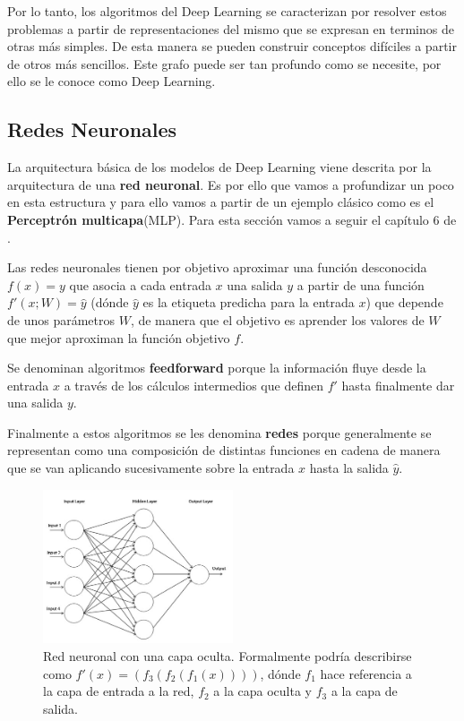     Por lo tanto, los algoritmos del Deep Learning se caracterizan por resolver estos problemas a partir de representaciones del mismo que se expresan en terminos de otras más simples. De esta manera se pueden construir conceptos difíciles a partir de otros más sencillos. Este grafo puede ser tan profundo como se necesite, por ello se le conoce como Deep Learning.

    \subsection{Redes Neuronales} \label{sub:redes_neuronales}
        La arquitectura básica de los modelos de Deep Learning viene descrita por la arquitectura de una \textbf{red neuronal}. Es por ello que vamos a profundizar un poco en esta estructura y para ello vamos a partir de un ejemplo clásico como es el \textbf{Perceptrón multicapa}(MLP). Para esta sección vamos a seguir el capítulo 6 de \cite{Goodfellow-et-al-2016}.

        \medskip

        \noindent Las redes neuronales tienen por objetivo aproximar una función desconocida $f(x)=y$ que asocia a cada entrada $x$ una salida $y$ a partir de una función $f'(x;W)= \widehat{y}$ (dónde $\widehat{y}$ es la etiqueta predicha para la entrada $x$) que depende de unos parámetros $W$, de manera que el objetivo es aprender los valores de $W$ que mejor aproximan la función objetivo $f$.

        \medskip

        \noindent Se denominan algoritmos \textbf{feedforward} porque la información fluye desde la entrada $x$ a través de los cálculos intermedios que definen $f'$ hasta finalmente dar una salida $y$.

        \medskip

        \noindent Finalmente a estos algoritmos se les denomina \textbf{redes} porque generalmente se representan como una composición de distintas funciones en cadena de manera que se van aplicando sucesivamente sobre la entrada $x$ hasta la salida $\widehat{y}$. 

        \begin{figure}[!h]
            \centering
            \includegraphics[width=0.5\textwidth]{img/single_hidden_layer.jpg}
            \caption{Red neuronal con una capa oculta. Formalmente podría describirse como $f'(x)=(f_3(f_2(f_1(x))))$, dónde $f_1$ hace referencia a la capa de entrada a la red, $f_2$ a la capa oculta y $f_3$ a la capa de salida.}
            \label{fig:red_neuronal_capa_oculta}
          \end{figure}

